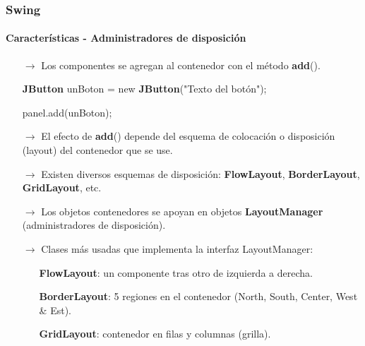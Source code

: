 \documentclass{beamer}
\begin{document}
    \begin{frame}
		\frametitle{Swing}
		\framesubtitle{Caracter\'isticas - Administradores de disposici\'on}

		\begin{itemize}
		    \item[$\rightarrow$] Los componentes se agregan al contenedor con el m\'etodo \textbf{add}().
		    \item[] \textbf{JButton} unBoton = new \textbf{JButton}("Texto del bot\'on");
		    \item[] panel.add(unBoton);
            \item[$\rightarrow$] El efecto de \textbf{add}() depende del esquema de colocaci\'on o disposici\'on (layout) del contenedor que se use.
        \end{itemize}

        \begin{itemize}
            \item[$\rightarrow$] Existen diversos esquemas de disposici\'on: \textbf{FlowLayout}, \textbf{BorderLayout}, \textbf{GridLayout}, etc.
            \item[$\rightarrow$] Los objetos contenedores se apoyan en objetos \textbf{LayoutManager} (administradores de disposici\'on).
            \item[$\rightarrow$] Clases m\'as usadas que implementa la interfaz LayoutManager:
            \begin{itemize}
    		        \item[\checkmark] \textbf{FlowLayout}: un componente tras otro de izquierda a derecha.
                \item[\checkmark] \textbf{BorderLayout}: 5 regiones en el contenedor (North, South, Center, West \& Est).
                \item[\checkmark] \textbf{GridLayout}: contenedor en filas y columnas (grilla).
            \end{itemize}
		\end{itemize}
	\end{frame}
\end{document}
